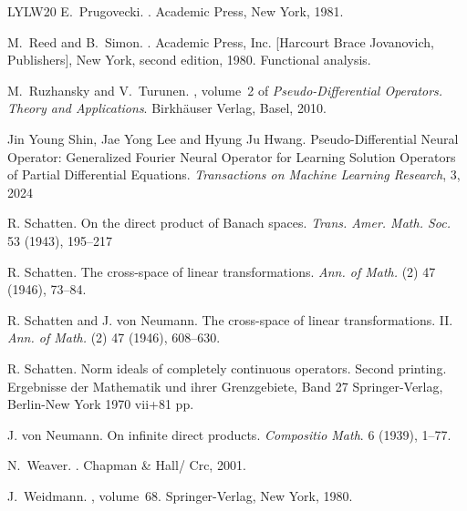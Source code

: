 \documentclass[a4paper,12pt,reqno]{amsart}
\theoremstyle{definition}
\theoremstyle{remark}
\numberwithin{equation}{section}
\begin{document}
\begin{thebibliography}{LYLW20}
E.~Prugovecki.
.
\newblock Academic Press, New York, 1981.

M.~Reed and B.~Simon.
.
\newblock Academic Press, Inc. [Harcourt Brace Jovanovich, Publishers], New
  York, second edition, 1980.
\newblock Functional analysis.

M.~Ruzhansky and V.~Turunen.
, volume~2 of {\em Pseudo-Differential
  Operators. Theory and Applications}.
\newblock Birkh{\"a}user Verlag, Basel, 2010.


 Jin Young Shin, Jae Yong Lee and Hyung Ju Hwang. Pseudo-Differential Neural Operator: Generalized Fourier
{N}eural Operator for Learning Solution Operators of Partial
Differential Equations. {\em Transactions on Machine Learning Research}, 3, 2024


  R. Schatten. On the direct product of Banach spaces. {\em Trans. Amer. Math. Soc.} 53 (1943), 195–217

  R. Schatten. The cross-space of linear transformations. {\em Ann. of Math.} (2) 47 (1946), 73–84.

   
    R. Schatten and J. von Neumann. The cross-space of linear transformations. II. {\em Ann. of Math.} (2) 47 (1946), 608–630. 

 R. Schatten. Norm ideals of completely continuous operators. Second printing. Ergebnisse der Mathematik und ihrer Grenzgebiete, Band 27 Springer-Verlag, Berlin-New York 1970 vii+81 pp.

 J. von Neumann. On infinite direct products. {\em Compositio Math}. 6 (1939), 1–77.

N.~Weaver.
.
\newblock Chapman \& Hall/ Crc, 2001.


J.~Weidmann.
, volume~68.
\newblock Springer-Verlag, New York, 1980.

\end{thebibliography}
\end{document}
